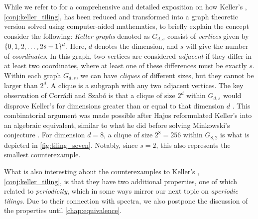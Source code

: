 \documentclass[../thesis.tex]{subfiles}
\begin{document}
While we refer to \cite{brakensiekResolutionKellerConjecture2020} for a comprehensive and detailed exposition on how Keller's , \cref{conj:keller_tiling}, has been reduced and transformed into a graph theoretic version solved using computer-aided mathematics, to briefly explain the concept consider the following: \emph{Keller graphs} denoted as $G_{d,s}$ consist of \emph{vertices} given by $\{0,1,2,\dots,2s-1\}^d$. Here, $d$ denotes the dimension, and $s$ will give the number of \emph{coordinates}. In this graph, two vertices are considered \emph{adjacent} if they differ in at least two coordinates, where at least one of these differences must be exactly $s$. Within each graph $G_{d,s}$, we can have \emph{cliques} of different sizes, but they cannot be larger than $2^d$. A clique is a subgraph with any two adjacent vertices. The key observation of Corr{\'a}di and Szab{\'o} is that a clique of size $2^d$ within $G_{d,s}$ would disprove Keller's  for dimensions greater than or equal to that dimension $d$ \cite{corradiCombinatorialApproachKeller1990}. This combinatorial argument was made possible after Hajos reformulated Keller's  into an algebraic equivalent, similar to what he did before solving Minkowski's conjecture \cite{lagariasKellerCubetilingConjecture1992,hajosUeberEinfacheUnd1942}. For dimension $d=8$, a clique of size $2^8=256$ within $G_{8,2}$ is what is depicted in \cref{fig:tiling_seven}. Notably, since $s=2$, this also represents the smallest counterexample. %

What is also interesting about the counterexamples to Keller's , \cref{conj:keller_tiling}, is that they have two additional properties, one of which related to \emph{periodicity}, which in some ways mirror our next topic on \emph{aperiodic tilings}. Due to their connection with spectra, we also postpone the discussion of the properties until \cref{chap:equivalence}.


\end{document}
